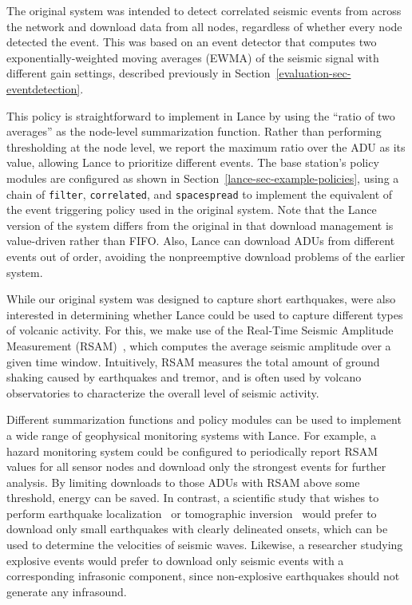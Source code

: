The original system was intended to detect correlated seismic events from
across the network and download data from all nodes, regardless of whether
every node detected the event. This was based on an event detector that
computes two exponentially-weighted moving averages (EWMA) of the seismic
signal with different gain settings, described previously in
Section~\ref{evaluation-sec-eventdetection}.

This policy is straightforward to implement in Lance by using the ``ratio of
two averages'' as the node-level summarization function. Rather than
performing thresholding at the node level, we report the maximum ratio over
the ADU as its value, allowing Lance to prioritize different events. The base
station's policy modules are configured as shown in
Section~\ref{lance-sec-example-policies}, using a chain of \texttt{filter},
\texttt{correlated}, and \texttt{spacespread} to implement the equivalent of
the event triggering policy used in the original system. Note that the Lance
version of the system differs from the original in that download management
is value-driven rather than FIFO. Also, Lance can download ADUs from
different events out of order, avoiding the nonpreemptive download problems
of the earlier system.

While our original system was designed to capture short earthquakes, were
also interested in determining whether Lance could be used to capture
different types of volcanic activity. For this, we make use of the Real-Time
Seismic Amplitude Measurement (RSAM)~\cite{rsam}, which computes the average
seismic amplitude over a given time window. Intuitively, RSAM measures the
total amount of ground shaking caused by earthquakes and tremor, and is often
used by volcano observatories to characterize the overall level of seismic
activity.

Different summarization functions and policy modules can be used to implement
a wide range of geophysical monitoring systems with Lance. For example, a
hazard monitoring system could be configured to periodically report RSAM
values for all sensor nodes and download only the strongest events for
further analysis. By limiting downloads to those ADUs with RSAM above some
threshold, energy can be saved. In contrast, a scientific study that wishes
to perform earthquake localization~\cite{aki-richards-80} or tomographic
inversion~\cite{lees-lindley-94} would prefer to download only small
earthquakes with clearly delineated onsets, which can be used to determine
the velocities of seismic waves. Likewise, a researcher studying explosive
events would prefer to download only seismic events with a corresponding
infrasonic component, since non-explosive earthquakes should not generate any
infrasound.

